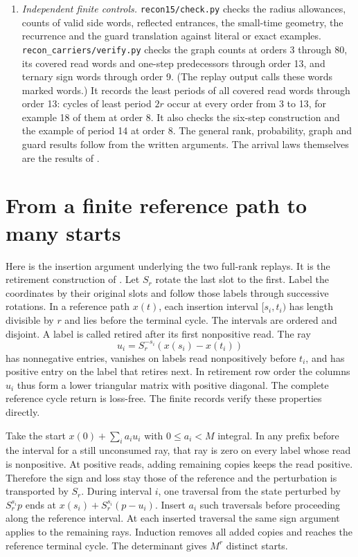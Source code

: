 \documentclass[11pt]{amsart}
\theoremstyle{definition}
\begin{document}
\begin{enumerate}
\item \emph{Independent finite controls.}
\texttt{recon15/check.py} checks the radius allowances,
counts of valid side words, reflected entrances, the
small-time geometry, the recurrence and the guard
translation against literal or exact examples.
\texttt{recon\_carriers/verify.py} checks the graph counts
at orders 3 through 80, its covered read words and one-step
predecessors through order 13, and ternary sign words
through order 9. (The replay output calls these words marked words.) It records the
least periods of all covered read words
through order 13: cycles of least period \(2r\) occur at every order
from 3 to 13, for example 18 of them at order 8. It also checks the
six-step construction
and the example of period 14 at order 8. The general
rank, probability, graph and guard results follow from
the written arguments. The arrival laws themselves
are the results of \cite{G3,G5}.
\end{enumerate}

\appendix
\section{From a finite reference path to many starts}
\label{app:retirement}

Here is the insertion argument underlying the two full-rank
replays. It is the retirement construction of
\cite[Section~4, Lemma~7, and Appendix~B]{G9}.
Let \(S_r\) rotate the last slot to the first. Label the
coordinates by their original slots and follow those
labels through successive rotations.
In a reference path \(x(t)\), each insertion interval
\([s_i,t_i)\) has length divisible by \(r\) and lies before
the terminal cycle. The intervals are ordered and disjoint.
A label is called retired after its first nonpositive read.
The ray
\[
 u_i=S_r^{-s_i}(x(s_i)-x(t_i))
\]
has nonnegative entries, vanishes on labels read
nonpositively before \(t_i\), and has positive entry on
the label that retires next. In retirement row order
the columns \(u_i\) thus form a lower triangular matrix
with positive diagonal. The complete reference cycle
return is loss-free. The finite records verify these
properties directly.

Take the start \(x(0)+\sum_i a_i u_i\) with
\(0\le a_i<M\) integral. In any prefix before the
interval for a still unconsumed ray, that ray is zero
on every label whose read is nonpositive. At positive
reads, adding remaining copies keeps the read positive.
Therefore the sign and loss stay those of the reference
and the perturbation is transported by \(S_r\).
During interval \(i\), one traversal from the
state perturbed by \(S_r^{s_i}p\) ends at
\(x(s_i)+S_r^{s_i}(p-u_i)\).
Insert \(a_i\) such traversals before proceeding along
the reference interval. At each inserted traversal
the same sign argument applies to the remaining rays.
Induction removes all added copies and reaches the
reference terminal cycle. The determinant gives \(M^r\)
distinct starts.
\end{document}
